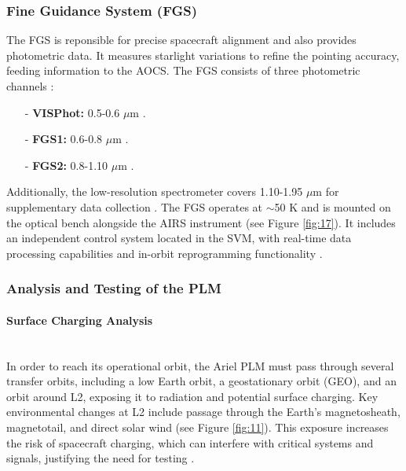 \documentclass[12pt]{article}
\begin{document}
\subsubsection{Fine Guidance System (FGS)} \label{sec:4.2.4}

The FGS is reponsible for precise spacecraft alignment and also provides photometric data. It measures starlight variations to refine the pointing accuracy, feeding information to the AOCS. The FGS
consists of three photometric channels \cite{martignac2022airs,ARIEL_M4_Proposal}:

\begin{itemize}
    \item[-] \textbf{VISPhot:} 0.5-0.6 $\mu$m \cite{salvignol2024ariel}.
    \item[-] \textbf{FGS1:} 0.6-0.8 $\mu$m \cite{salvignol2024ariel}.
    \item[-] \textbf{FGS2:} 0.8-1.10 $\mu$m \cite{salvignol2024ariel}.
\end{itemize}

Additionally, the low-resolution spectrometer covers 1.10-1.95 $\mu$m for supplementary data collection \cite{ARIEL_M4_Proposal,salvignol2024ariel}. The FGS operates at $\sim$50 K and is mounted on the optical bench alongside the AIRS instrument (see Figure \ref{fig:17}).
It includes an independent control system located in the SVM, with real-time data processing capabilities and in-orbit reprogramming functionality \cite{ARIEL_M4_Proposal}.

\subsubsection{Analysis and Testing of the PLM} \label{sec:4.2.5}

\paragraph{Surface Charging Analysis} ~\\

In order to reach its operational orbit, the Ariel PLM must pass through several transfer orbits, including a low Earth orbit, a geostationary orbit (GEO), and an orbit around L2, exposing it to radiation and potential surface charging. Key environmental changes at L2
include passage through the Earth's magnetosheath, magnetotail, and direct solar wind (see Figure \ref{fig:11}). This exposure increases the risk of spacecraft charging, which can interfere with critical systems and signals, justifying the need for testing \cite{Michelagnoli_Focardi_Pudney_Renouf_Merola_Noce_Nunez_Dinuzzi_Chiarucci_2024}.
\end{document}
